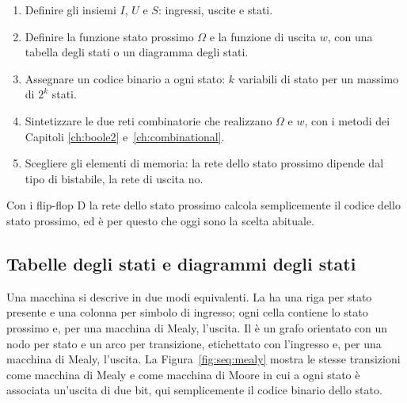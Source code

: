 \begin{enumerate}
\item Definire gli insiemi $I$, $U$ e $S$: ingressi, uscite e stati.
\item Definire la funzione stato prossimo $\Omega$ e la funzione di uscita
  $w$, con una tabella degli stati o un diagramma degli stati.
\item Assegnare un codice binario a ogni stato: $k$ variabili di stato per un
  massimo di $2^{k}$ stati.
\item Sintetizzare le due reti combinatorie che realizzano $\Omega$ e $w$, con
  i metodi dei Capitoli \ref{ch:boole2} e~\ref{ch:combinational}.
\item Scegliere gli elementi di memoria: la rete dello stato prossimo dipende
  dal tipo di bistabile, la rete di uscita no.
\end{enumerate}

Con i flip-flop D la rete dello stato prossimo calcola semplicemente il codice
dello stato prossimo, ed è per questo che oggi sono la scelta abituale.

\subsection{Tabelle degli stati e diagrammi degli stati}

Una macchina si descrive in due modi equivalenti. La 
ha una riga per stato presente e una colonna per simbolo di ingresso; ogni
cella contiene lo stato prossimo e, per una macchina di Mealy, l'uscita. Il
 è un grafo orientato con un nodo per stato e un
arco per transizione, etichettato con l'ingresso e, per una macchina di Mealy,
l'uscita. La Figura~\ref{fig:seq:mealy} mostra le stesse transizioni come
macchina di Mealy e come macchina di Moore in cui a ogni stato è associata
un'uscita di due bit, qui semplicemente il codice binario dello stato.

